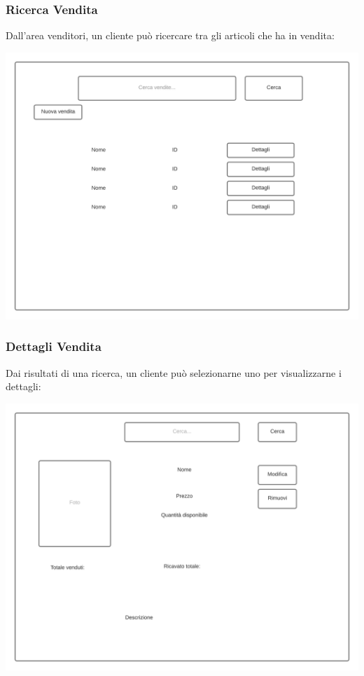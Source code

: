 \documentclass[12pt]{article}
\begin{document}
\newpage

\subsubsection{Ricerca Vendita}
Dall'area venditori, un cliente può ricercare tra gli articoli che ha in vendita:

\begin{center}
\includegraphics[height=0.3\textheight]{Mockup/Cliente/ElencoVendite}
\end{center}

\subsubsection{Dettagli Vendita}
Dai risultati di una ricerca, un cliente può selezionarne uno per visualizzarne i dettagli:

\begin{center}
\includegraphics[height=0.3\textheight]{Mockup/Cliente/DettagliVendita}
\end{center}
\end{document}
